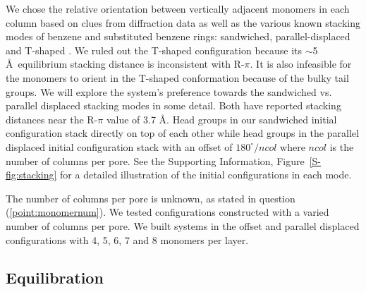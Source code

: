 \documentclass[journal=jpcbfk,manusciprt=article]{achemso}
\begin{document}

  We chose the relative orientation between vertically adjacent monomers in each column 
  based on clues from diffraction data as well as the various known stacking modes of 
  benzene and substituted benzene rings: sandwiched, parallel-displaced and T-shaped
  \cite{sinnokrot_estimates_2002}. We ruled out the T-shaped configuration
  because its $\sim$5 \AA~equilibrium stacking distance \cite{sinnokrot_estimates_2002}
  is inconsistent with R-$\pi$. It is also infeasible for the monomers to orient in the 
  T-shaped conformation because of the bulky tail groups. We will explore the system's 
  preference towards the sandwiched vs. parallel displaced stacking modes in some detail.
  Both have reported stacking distances near the R-$\pi$ value of 3.7 \AA. Head groups in
  our sandwiched initial configuration stack directly on top of each other while
  head groups in the parallel displaced initial configuration stack with an offset
  of $180^\circ/ncol$ where $ncol$ is the number of columns per pore. See the Supporting
  Information, Figure~\ref{S-fig:stacking} for a detailed illustration of the initial
  configurations in each mode.
  

  The number of columns per pore is unknown, as stated in question
  (\ref{point:monomernum}). We tested configurations constructed with a varied
  number of columns per pore. We built systems in the offset and parallel
  displaced configurations with 4, 5, 6, 7 and 8 monomers per layer.

  \subsection{Equilibration}
\end{document}
